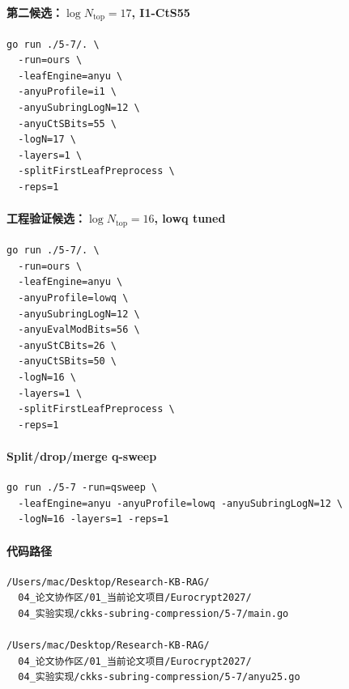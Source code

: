 \documentclass[UTF8,fontset=fandol]{ctexart}
\begin{document}
\paragraph{第二候选：\(\log N_{\mathrm{top}}=17\), I1-CtS55}
\begin{verbatim}
go run ./5-7/. \
  -run=ours \
  -leafEngine=anyu \
  -anyuProfile=i1 \
  -anyuSubringLogN=12 \
  -anyuCtSBits=55 \
  -logN=17 \
  -layers=1 \
  -splitFirstLeafPreprocess \
  -reps=1
\end{verbatim}

\paragraph{工程验证候选：\(\log N_{\mathrm{top}}=16\), lowq tuned}
\begin{verbatim}
go run ./5-7/. \
  -run=ours \
  -leafEngine=anyu \
  -anyuProfile=lowq \
  -anyuSubringLogN=12 \
  -anyuEvalModBits=56 \
  -anyuStCBits=26 \
  -anyuCtSBits=50 \
  -logN=16 \
  -layers=1 \
  -splitFirstLeafPreprocess \
  -reps=1
\end{verbatim}

\paragraph{Split/drop/merge q-sweep}
\begin{verbatim}
go run ./5-7 -run=qsweep \
  -leafEngine=anyu -anyuProfile=lowq -anyuSubringLogN=12 \
  -logN=16 -layers=1 -reps=1
\end{verbatim}

\paragraph{代码路径}
\begin{verbatim}
/Users/mac/Desktop/Research-KB-RAG/
  04_论文协作区/01_当前论文项目/Eurocrypt2027/
  04_实验实现/ckks-subring-compression/5-7/main.go

/Users/mac/Desktop/Research-KB-RAG/
  04_论文协作区/01_当前论文项目/Eurocrypt2027/
  04_实验实现/ckks-subring-compression/5-7/anyu25.go
\end{verbatim}
\end{document}
